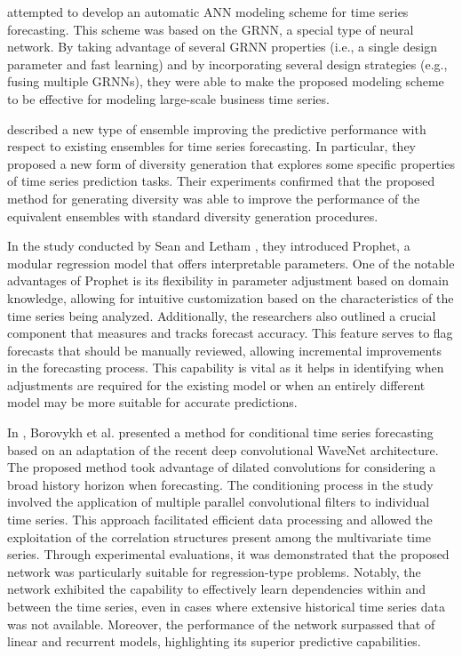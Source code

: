 \cite{6210391} attempted to develop an automatic ANN modeling scheme for time series forecasting.
This scheme was based on the GRNN, a special type of neural network.
By taking advantage of several GRNN properties (i.e., a single design parameter and fast learning) and by incorporating several design strategies (e.g., fusing multiple GRNNs), they were able to make the proposed modeling scheme to be effective for modeling large-scale business time series.

\cite{Oliveira2015} described a new type of ensemble improving the predictive performance with respect to existing ensembles for time series forecasting.
In particular, they proposed a new form of diversity generation that explores some specific properties of time series prediction tasks.
Their experiments confirmed that the proposed method for generating diversity was able to improve the performance of the equivalent ensembles with standard diversity generation procedures.

In the study conducted by Sean and Letham \cite{Sean2017}, they introduced Prophet, a modular regression model that offers interpretable parameters.
One of the notable advantages of Prophet is its flexibility in parameter adjustment based on domain knowledge, allowing for intuitive customization based on the characteristics of the time series being analyzed.
Additionally, the researchers also outlined a crucial component that measures and tracks forecast accuracy.
This feature serves to flag forecasts that should be manually reviewed, allowing incremental improvements in the forecasting process.
This capability is vital as it helps in identifying when adjustments are required for the existing model or when an entirely different model may be more suitable for accurate predictions.

In \cite{Borovykh2017}, Borovykh et al. presented a method for conditional time series forecasting based on an adaptation of the recent deep convolutional WaveNet architecture.
The proposed method took advantage of dilated convolutions for considering a broad history horizon when forecasting.
The conditioning process in the study involved the application of multiple parallel convolutional filters to individual time series.
This approach facilitated efficient data processing and allowed the exploitation of the correlation structures present among the multivariate time series.
Through experimental evaluations, it was demonstrated that the proposed network was particularly suitable for regression-type problems.
Notably, the network exhibited the capability to effectively learn dependencies within and between the time series, even in cases where extensive historical time series data was not available.
Moreover, the performance of the network surpassed that of linear and recurrent models, highlighting its superior predictive capabilities.

